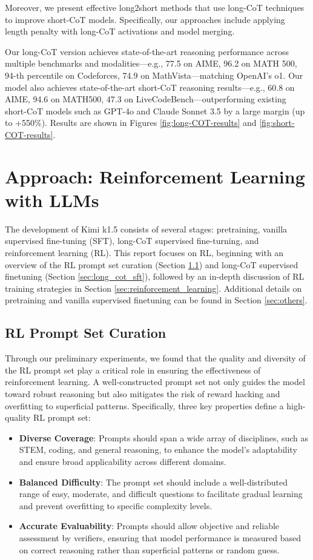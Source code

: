 \documentclass{article}
\begin{document}
Moreover, we present effective long2short methods that use long-CoT techniques to improve short-CoT models. Specifically, our approaches include applying length penalty with long-CoT activations and model merging.

Our long-CoT version achieves state-of-the-art reasoning performance across multiple benchmarks and modalities---e.g., 77.5 on AIME, 96.2 on MATH 500, 94-th percentile on Codeforces, 74.9 on MathVista---matching OpenAI's o1.
Our model also achieves state-of-the-art short-CoT reasoning results---e.g., 60.8 on AIME, 94.6 on MATH500, 47.3 on LiveCodeBench---outperforming existing short-CoT models such as GPT-4o and Claude Sonnet 3.5 by a large margin (up to +550\%). Results are shown in Figures \ref{fig:long-COT-results} and \ref{fig:short-COT-results}.

\section{Approach: Reinforcement Learning with LLMs}
\label{sec:post_training}

The development of Kimi k1.5 consists of several stages: pretraining, vanilla supervised fine-tuning (SFT), long-CoT supervised fine-turning, and reinforcement learning (RL).
This report focuses on RL, beginning with an overview of the RL prompt set curation (Section \ref{sec:rl_prompt}) and long-CoT supervised finetuning (Section \ref{sec:long_cot_sft}), followed by an in-depth discussion of RL training strategies in Section \ref{sec:reinforcement_learning}. 
Additional details on pretraining and vanilla supervised finetuning can be found in Section \ref{sec:others}.

\subsection{RL Prompt Set Curation} 
\label{sec:rl_prompt}
Through our preliminary experiments, we found that the quality and diversity of the RL prompt set play a critical role in ensuring the effectiveness of reinforcement learning. A well-constructed prompt set not only guides the model toward robust reasoning but also mitigates the risk of reward hacking and overfitting to superficial patterns. Specifically, three key properties define a high-quality RL prompt set:
\begin{itemize}
    \item \textbf{Diverse Coverage}: Prompts should span a wide array of disciplines, such as STEM, coding, and general reasoning, to enhance the model’s adaptability and ensure broad applicability across different domains.
    \item \textbf{Balanced Difficulty}: The prompt set should include a well-distributed range of easy, moderate, and difficult questions to facilitate gradual learning and prevent overfitting to specific complexity levels.
    \item \textbf{Accurate Evaluability}: Prompts should allow objective and reliable assessment by verifiers, ensuring that model performance is measured based on correct reasoning rather than superficial patterns or random guess. 
\end{itemize}
\end{document}
